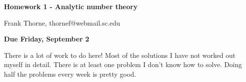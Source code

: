 \documentclass[12pt]{article}
\begin{document}
\setlength{\topmargin}{-2mm}





\begin{center}{\bf Homework 1 - Analytic number theory}
\end{center}
\begin{center}Frank Thorne, thornef@webmail.sc.edu
\end{center}
\begin{center}
{\bf Due Friday, September 2}
\end{center}

There is a lot of work to do here! Most of the solutions I have not worked out myself in detail.
There is at least one problem I don't know how to solve.
Doing half the problems every week is pretty good.
\\
\\
\end{document}
